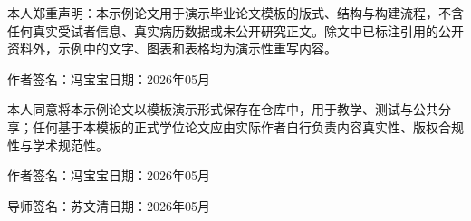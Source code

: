本人郑重声明：本示例论文用于演示毕业论文模板的版式、结构与构建流程，不含任何真实受试者信息、真实病历数据或未公开研究正文。除文中已标注引用的公开资料外，示例中的文字、图表和表格均为演示性重写内容。

\vspace{2\baselineskip}
作者签名：冯宝宝\hfill 日期：2026年05月

\vspace{3\baselineskip}
本人同意将本示例论文以模板演示形式保存在仓库中，用于教学、测试与公共分享；任何基于本模板的正式学位论文应由实际作者自行负责内容真实性、版权合规性与学术规范性。

\vspace{2\baselineskip}
作者签名：冯宝宝\hfill 日期：2026年05月

\vspace{2\baselineskip}
导师签名：苏文清\hfill 日期：2026年05月
